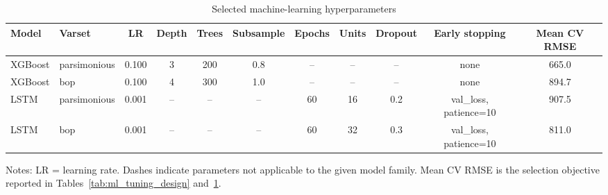 \begin{table}[htbp]
\centering
\scriptsize
\caption{Selected machine-learning hyperparameters}
\label{tab:ml_tuning_selected}
\begin{tabular}{llccccccccc}
\toprule
Model & Varset & LR & Depth & Trees & Subsample & Epochs & Units & Dropout & Early stopping & Mean CV RMSE \\
\midrule
XGBoost & parsimonious & 0.100 & 3 & 200 & 0.8 & -- & -- & -- & none & 665.0 \\
XGBoost & bop & 0.100 & 4 & 300 & 1.0 & -- & -- & -- & none & 894.7 \\
LSTM & parsimonious & 0.001 & -- & -- & -- & 60 & 16 & 0.2 & val\_loss, patience=10 & 907.5 \\
LSTM & bop & 0.001 & -- & -- & -- & 60 & 32 & 0.3 & val\_loss, patience=10 & 811.0 \\
\bottomrule
\end{tabular}
\begin{tablenotes}
\footnotesize
\item Notes: LR = learning rate. Dashes indicate parameters not applicable to the given model family. 
Mean CV RMSE is the selection objective reported in Tables~\ref{tab:ml_tuning_design} and~\ref{tab:ml_tuning_selected}.
\end{tablenotes}
\end{table}